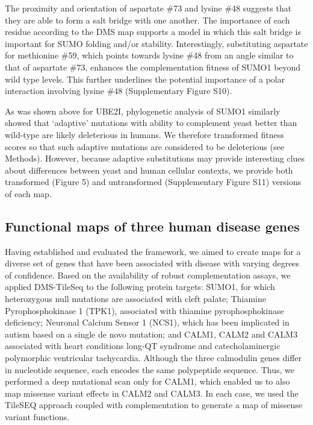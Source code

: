 The proximity and orientation of aspartate \#73 and lysine \#48 suggests that they are able to form a salt bridge with one another.  The importance of each residue according to the DMS map supports a model in which this salt bridge is important for SUMO folding and/or stability. Interestingly, substituting aspartate for methionine \#59, which points towards lysine \#48 from an angle similar to that of aspartate \#73, enhances the complementation fitness of SUMO1 beyond wild type levels.  This further underlines the potential importance of a polar interaction involving lysine \#48 (Supplementary Figure S10).


As was shown above for UBE2I, phylogenetic analysis of SUMO1 similarly showed that ‘adaptive’ mutations with ability to complement yeast better than wild-type are likely deleterious in humans. We therefore transformed fitness scores so that such adaptive mutations are considered to be deleterious (see Methods).  However, because adaptive substitutions may provide interesting clues about differences between yeast and human cellular contexts, we provide both transformed (Figure 5) and untransformed (Supplementary Figure S11) versions of each map.




\subsection{Functional maps of three human disease genes}

Having established and evaluated the framework, we aimed to create maps for a diverse set of genes that have been associated with disease with varying degrees of confidence. Based on the availability of robust complementation assays, we applied DMS-TileSeq to the following protein targets: SUMO1, for which heterozygous null mutations are associated with cleft palate; Thiamine Pyrophosphokinase 1 (TPK1), associated with thiamine pyrophosphokinase deficiency; Neuronal Calcium Sensor 1 (NCS1), which has been implicated in autism based on a single de novo mutation;  and CALM1, CALM2 and CALM3 associated with heart conditions long-QT syndrome and catecholaminergic polymorphic ventricular tachycardia. Although the three calmodulin genes differ in nucleotide sequence, each encodes the same polypeptide sequence. Thus, we performed a deep mutational scan only for CALM1, which enabled us to also map missense variant effects in CALM2 and CALM3. In each case, we used the TileSEQ approach coupled with complementation to generate a map of missense variant functions. 

